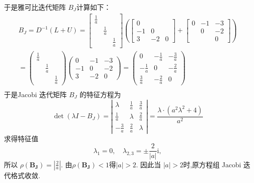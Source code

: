 \begin{tcolorbox}
于是雅可比迭代矩阵 $ B_{J} $计算如下：
$$
\begin{array}{l}
B_{J}=D^{-1}(L+U)=\left[\begin{array}{lll}
\frac{1}{a} & & \\
& \frac{1}{a} & \\
& & \frac{1}{a}
\end{array}\right]\left(\left[\begin{array}{ccc}
0 & & \\
-1 & 0 & \\
3 & -2 & 0
\end{array}\right]+\left[\begin{array}{ccc}
0 & -1 & -3 \\
& 0 & -2 \\
& & 0
\end{array}\right]\right) \\
=\left(\begin{array}{lll}
\frac{1}{a} & & \\
& \frac{1}{a} & \\
& & \frac{1}{a}
\end{array}\right)\left(\begin{array}{ccc}
0 & -1 & -3 \\
-1 & 0 & -2 \\
3 & -2 & 0
\end{array}\right) =\left(\begin{array}{ccc}
0 & -\frac{1}{a} & -\frac{3}{a} \\
-\frac{1}{a} & 0 & -\frac{2}{a} \\
\frac{3}{a} & -\frac{2}{a} & 0
\end{array}\right) \\
\end{array}
$$
 于是Jacobi 迭代矩阵 $ B_J $ 的特征方程为
$$
\operatorname{det}\left(\lambda I-B_{J}\right)=\left|\begin{array}{ccc}
\lambda & \frac{1}{a} & \frac{3}{a} \\
\frac{1}{a} & \lambda & \frac{2}{a} \\
-\frac{3}{a} & \frac{2}{a} & \lambda
\end{array}\right|=\frac{\lambda \cdot\left(a^{2} \lambda^{2}+4\right)}{a^{2}} 
$$
求得特征值
$$
\lambda_{1}=0, \quad \lambda_{2,3}= \pm \frac{2}{|a|} \mathrm{i},
$$
所以 $ \rho(\boldsymbol{B_J})=\left|\frac{2}{a}\right| $. 由$\rho(\boldsymbol{B_J})<1$得$ |a|>2 $. 因此当 $ |a|>2 $时,原方程组 Jacobi 迭代格式收敛.


\end{tcolorbox}


